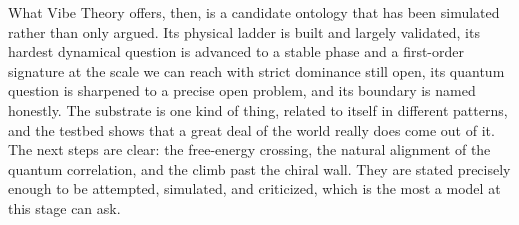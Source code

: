 What Vibe Theory offers, then, is a candidate ontology that has been simulated rather than only argued. Its physical ladder is built and largely validated, its hardest dynamical question is advanced to a stable phase and a first-order signature at the scale we can reach with strict dominance still open, its quantum question is sharpened to a precise open problem, and its boundary is named honestly. The substrate is one kind of thing, related to itself in different patterns, and the testbed shows that a great deal of the world really does come out of it. The next steps are clear: the free-energy crossing, the natural alignment of the quantum correlation, and the climb past the chiral wall. They are stated precisely enough to be attempted, simulated, and criticized, which is the most a model at this stage can ask.
